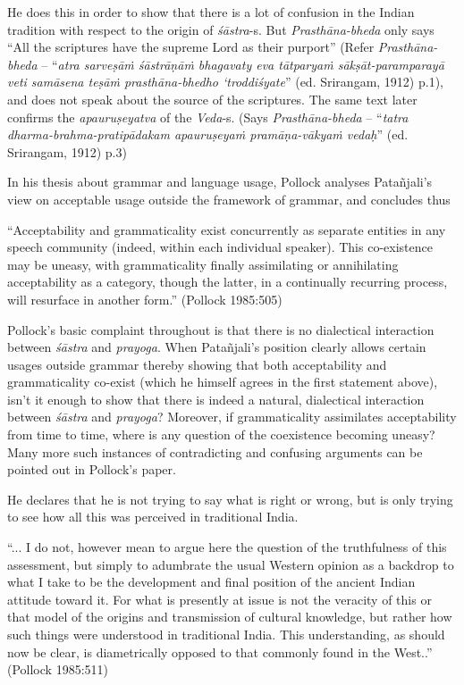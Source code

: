 He does this in order to show that there is a lot of confusion in the Indian tradition with respect to the origin of {\it śāstra}-s. But \textit{Prasthāna-bheda} only says ``All the scriptures have the supreme Lord as their purport'' (Refer \textit{Prasthāna-bheda} -- ``\textit{atra sarveṣāṁ śāstrāṇāṁ bhagavaty eva tātparyaṁ sākṣāt-paramparayā veti samāsena teṣāṁ prasthāna-bhedho `troddiśyate}'' (ed. Srirangam, 1912) p.1), and does not speak about the source of the scriptures. The same text later confirms the {\it apauruṣeyatva} of the {\it Veda}-s. (Says \textit{Prasthāna-bheda} -- ``\textit{tatra dharma-brahma-pratipādakam apauruṣeyaṁ pramāṇa-vākyaṁ vedaḥ}'' (ed. Srirangam, 1912) p.3)

In his thesis about grammar and language usage, Pollock analyses Patañjali’s view on acceptable usage outside the framework of grammar, and concludes thus
\begin{myquote}
``Acceptability and grammaticality exist concurrently as separate entities in any speech community (indeed, within each individual speaker). This co-existence may be uneasy, with grammaticality finally assimilating or annihilating acceptability as a category, though the latter, in a continually recurring process, will resurface in another form.'' (Pollock 1985:505)
\end{myquote}

Pollock's basic complaint throughout is that there is no dialectical interaction between {\it śāstra} and {\it prayoga}. When Patañjali’s position clearly allows certain usages outside grammar thereby showing that both acceptability and grammaticality co-exist (which he himself agrees in the first statement above), isn't it enough to show that there is indeed a natural, dialectical interaction between {\it śāstra} and {\it prayoga}? Moreover, if grammaticality assimilates acceptability from time to time, where is any question of the coexistence becoming uneasy? Many more such instances of contradicting and confusing arguments can be pointed out in Pollock's paper.

He declares that he is not trying to say what is right or wrong, but is only trying to see how all this was perceived in traditional India. 
\begin{myquote}
``... I do not, however mean to argue here the question of the truthfulness of this assessment, but simply to adumbrate the usual Western opinion as a backdrop to what I take to be the development and final position of the ancient Indian attitude toward it. For what is presently at issue is not the veracity of this or that model of the origins and transmission of cultural knowledge, but rather how such things were understood in traditional India. This understanding, as should now be clear, is diametrically opposed to that commonly found in the West..'' (Pollock 1985:511)
\end{myquote}

